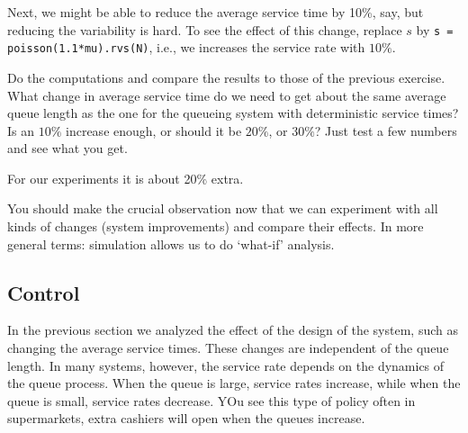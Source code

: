 \documentclass{scrartcl}
\begin{document}
\begin{exercise}
  Next, we might be able to reduce the average service time by 10\%, say, but reducing the variability is hard. To see the effect of this change, replace $s$ by
  \texttt{s = poisson(1.1*mu).rvs(N)}, i.e., we increases the service rate with $10\%$. 

Do the computations and compare the results to those of the previous exercise. What change in average service time do we need to get about the same average queue length as the one for the queueing system with deterministic service times? Is an $10\%$ increase enough, or should it be $20\%$, or $30\%$? Just test a few numbers and see what you get. 
  \begin{solution}
For our experiments it is about 20\% extra.
  \end{solution}
\end{exercise}

You should make the crucial observation now that we can experiment with all kinds of changes (system improvements) and compare their effects. In more general terms: simulation allows us to do `what-if' analysis. 

\subsection{Control }
\label{sec:control-}

In the previous section we analyzed the effect of the design of the system, such as changing the average service times. These changes are independent of the queue length. In many systems, however, the service rate depends on the dynamics of the queue process. When the queue is large, service rates increase, while when the queue is small, service rates decrease.  YOu see this type of policy often in supermarkets, extra cashiers will open when the queues increase.
\end{document}
